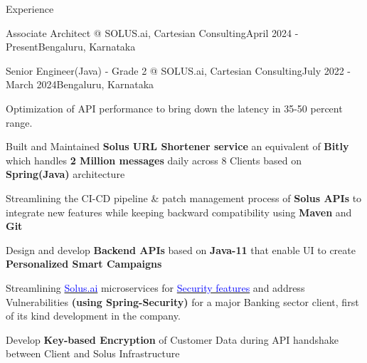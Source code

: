 \documentclass[
	a4paper, %
	12pt, %
]{resume} %
\begin{document}
\begin{rSection}{Experience}
\begin{rSubsection}{Associate Architect @ SOLUS.ai, Cartesian Consulting}{April 2024 - Present}{}{Bengaluru, Karnataka}
	\end{rSubsection}

	\hspace{-2em} 
	\begin{rSubsection}{Senior Engineer(Java) - Grade 2 @ SOLUS.ai, Cartesian Consulting}{July  2022 - March 2024}{}{Bengaluru, Karnataka}
	\item Optimization of API performance to bring down the latency in 35-50 percent range.
	\item Built and Maintained \textbf{Solus URL Shortener service} an equivalent of \textbf{Bitly} which handles \textbf{2 Million messages} daily across 8 Clients based on \textbf{Spring(Java)} architecture
	\item Streamlining the CI-CD pipeline \& patch management process of \textbf{Solus APIs} to integrate new features while keeping backward compatibility using \textbf{Maven} and \textbf{Git}
	\item Design and develop \textbf{Backend APIs} based on \textbf{Java-11} that enable UI to create \textbf{ Personalized Smart Campaigns}
	\item Streamlining \href{https://docs.solus.ai/docs/category/security-features}{\textcolor{blue}{Solus.ai}} microservices for  \href{https://docs.solus.ai/docs/category/security-features}{\textcolor{blue}{Security features}} and address Vulnerabilities \textbf{(using Spring-Security)} for a major Banking sector client, first of its kind development in the company.
	\item Develop \textbf{Key-based Encryption} of Customer Data during API handshake between Client and Solus Infrastructure
\end{rSubsection}


\end{rSection}
\end{document}
